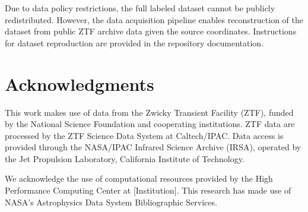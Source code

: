 \documentclass[11pt,a4paper]{article}
\begin{document}
Due to data policy restrictions, the full labeled dataset cannot be publicly redistributed. However, the data acquisition pipeline enables reconstruction of the dataset from public ZTF archive data given the source coordinates. Instructions for dataset reproduction are provided in the repository documentation.

\section*{Acknowledgments}

This work makes use of data from the Zwicky Transient Facility (ZTF), funded by the National Science Foundation and cooperating institutions. ZTF data are processed by the ZTF Science Data System at Caltech/IPAC. Data access is provided through the NASA/IPAC Infrared Science Archive (IRSA), operated by the Jet Propulsion Laboratory, California Institute of Technology.

We acknowledge the use of computational resources provided by the High Performance Computing Center at [Institution]. This research has made use of NASA's Astrophysics Data System Bibliographic Services.
\end{document}
